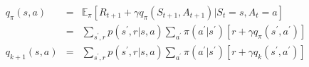 \documentclass{article}
\begin{document}
\thispagestyle{empty}
\begin{eqnarray*}
q_\pi(s, a) &=& \mathbb{E}_\pi[R_{t+1}+\gamma q_\pi(S_{t+1}, A_{t+1})|S_t=s, A_t=a] \\
&=& \sum_{s^\prime, r} p(s^\prime, r|s,a) \sum_{a^\prime} \pi(a^\prime|s^\prime) [r+\gamma q_\pi(s^\prime, a^\prime)] \\
q_{k+1}(s, a) &=& \sum_{s^\prime, r} p(s^\prime, r|s,a) \sum_{a^\prime} \pi(a^\prime|s^\prime) [r+\gamma q_k(s^\prime, a^\prime)]
\end{eqnarray*}
\end{document}
